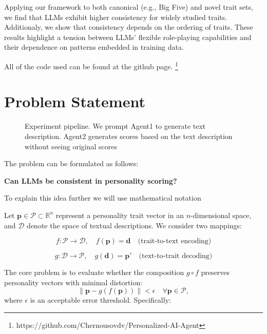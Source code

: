 \documentclass[12pt]{article}
\begin{document}
Applying our framework to both canonical (e.g., Big Five) and novel trait sets, we find that LLMs exhibit higher consistency for widely studied traits. Additionaly, we show that consistency depends on the ordering of traits. These results highlight a tension between LLMs’ flexible role-playing capabilities and their dependence on patterns embedded in training data.


All of the code used can be found at the github page. \footnote{https://github.com/Chernousovdv/Personalized-AI-Agent}
\section{Problem Statement}

\begin{figure}[htbp]
  \centering
  \caption{Experiment pipeline. We prompt Agent1 to generate text description. Agent2 generates scores based on the text description without seeing original scores}
  \label{fig:personality}
\end{figure}

The problem can be formulated as follows:

\begin{center}
    \textbf{Can LLMs be consistent in personality scoring?}
\end{center}

To explain this idea further we will use mathematical notation

Let $\mathbf{p} \in \mathcal{P} \subset \mathbb{R}^n$ represent a personality trait vector in an $n$-dimensional space, and $\mathcal{D}$ denote the space of textual descriptions. We consider two mappings:

\begin{equation}
    f: \mathcal{P} \to \mathcal{D}, \quad f(\mathbf{p}) = \mathbf{d} \quad \text{(trait-to-text encoding)}
\end{equation}

\begin{equation}
    g: \mathcal{D} \to \mathcal{P}, \quad g(\mathbf{d}) = \mathbf{p'} \quad \text{(text-to-trait decoding)}
\end{equation}

The core problem is to evaluate whether the composition $g \circ f$ preserves personality vectors with minimal distortion:
\begin{equation}
    \|\mathbf{p} - g(f(\mathbf{p}))\| < \epsilon \quad \forall \mathbf{p} \in \mathcal{P},
\end{equation}
where $\epsilon$ is an acceptable error threshold. Specifically:
\end{document}
